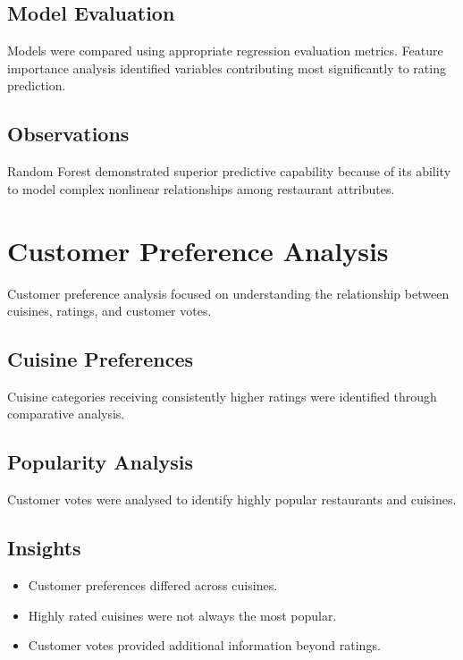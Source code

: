 \documentclass[12pt,a4paper]{report}
\begin{document}
\subsection{Model Evaluation}

Models were compared using appropriate regression evaluation metrics. Feature importance analysis identified variables contributing most significantly to rating prediction.

\subsection{Observations}

Random Forest demonstrated superior predictive capability because of its ability to model complex nonlinear relationships among restaurant attributes.


\section{Customer Preference Analysis}

Customer preference analysis focused on understanding the relationship between cuisines, ratings, and customer votes.

\subsection{Cuisine Preferences}

Cuisine categories receiving consistently higher ratings were identified through comparative analysis.

\subsection{Popularity Analysis}

Customer votes were analysed to identify highly popular restaurants and cuisines.

\subsection{Insights}

\begin{itemize}
\item Customer preferences differed across cuisines.
\item Highly rated cuisines were not always the most popular.
\item Customer votes provided additional information beyond ratings.
\end{itemize}
\end{document}

